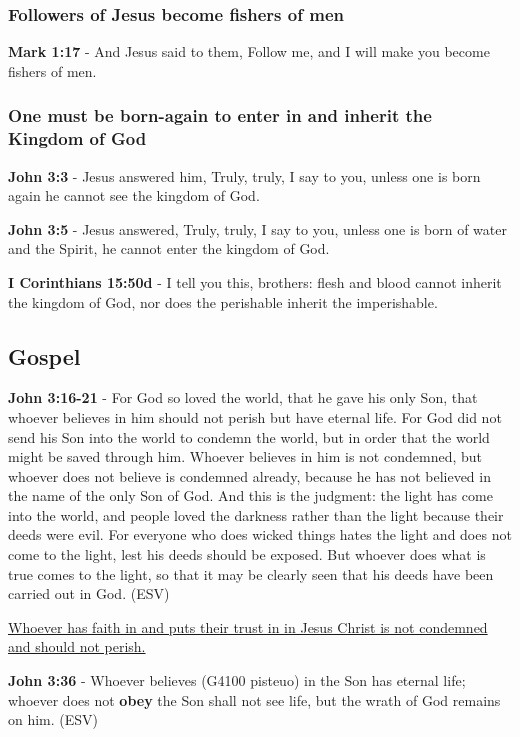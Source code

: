 \documentclass[11pt]{article}
\begin{document}
\subsubsection{Followers of Jesus become fishers of men}
\label{sec:org78112d3}

\textbf{Mark 1:17} - And Jesus said to them, Follow me, and I will make you become fishers of men.

\subsubsection{One must be born-again to enter in and inherit the Kingdom of God}
\label{sec:org78fb2e1}
\textbf{John 3:3} - Jesus answered him, Truly, truly, I say to you, unless one is born again he cannot see the kingdom of God.

\textbf{John 3:5} - Jesus answered, Truly, truly, I say to you, unless one is born of water and the Spirit, he cannot enter the kingdom of God.

\textbf{I Corinthians 15:50d} - I tell you this, brothers: flesh and blood cannot inherit the kingdom of God, nor does the perishable inherit the imperishable.

\subsection{Gospel}
\label{sec:org4617a54}
\textbf{John 3:16-21} -  For God so loved the world, that he gave his only Son, that whoever believes in him should not perish but have eternal life.  For God did not send his Son into the world to condemn the world, but in order that the world might be saved through him.  Whoever believes in him is not condemned, but whoever does not believe is condemned already, because he has not believed in the name of the only Son of God.  And this is the judgment: the light has come into the world, and people loved the darkness rather than the light because their deeds were evil.  For everyone who does wicked things hates the light and does not come to the light, lest his deeds should be exposed.  But whoever does what is true comes to the light, so that it may be clearly seen that his deeds have been carried out in God.  (ESV)

\uline{Whoever has faith in and puts their trust in in Jesus Christ is not condemned and should not perish.}

\textbf{John 3:36} - Whoever believes (G4100 pisteuo) in the Son has eternal life; whoever does not \textbf{obey} the Son shall not see life, but the wrath of God remains on him. (ESV)
\end{document}
